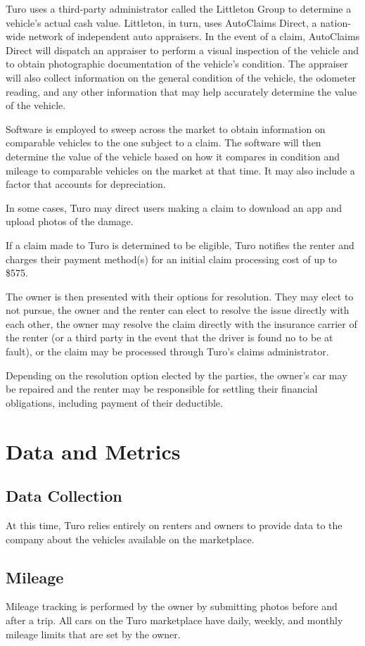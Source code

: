 \documentclass[review,12pt]{elsarticle}
\begin{document}
Turo uses a third-party administrator called the Littleton Group to determine a vehicle's actual cash value. Littleton, in turn, uses AutoClaims Direct, a nation-wide network of independent auto appraisers. In the event of a claim, AutoClaims Direct will dispatch an appraiser to perform a visual inspection of the vehicle and to obtain photographic documentation of the vehicle's condition. The appraiser will also collect information on the general condition of the vehicle, the odometer reading, and any other information that may help accurately determine the value of the vehicle.

Software is employed to sweep across the market to obtain information on comparable vehicles to the one subject to a claim. The software will then determine the value of the vehicle based on how it compares in condition and mileage to comparable vehicles on the market at that time. It may also include a factor that accounts for depreciation.

In some cases, Turo may direct users making a claim to download an app and upload photos of the damage.

If a claim made to Turo is determined to be eligible, Turo notifies the renter and charges their payment method(s) for an initial claim processing cost of up to \$575.

The owner is then presented with their options for resolution. They may elect to not pursue, the owner and the renter can elect to resolve the issue directly with each other, the owner may resolve the claim directly with the insurance carrier of the renter (or a third party in the event that the driver is found no to be at fault), or the claim may be processed through Turo's claims administrator.

Depending on the resolution option elected by the parties, the owner's car may be repaired and the renter may be responsible for settling their financial obligations, including payment of their deductible.

\section{Data and Metrics}
  \subsection{Data Collection}
  At this time, Turo relies entirely on renters and owners to provide data to the company about the vehicles available on the marketplace.
  \subsection{Mileage}
  Mileage tracking is performed by the owner by submitting photos before and after a trip. All cars on the Turo marketplace have daily, weekly, and monthly mileage limits that are set by the owner.
\end{document}
